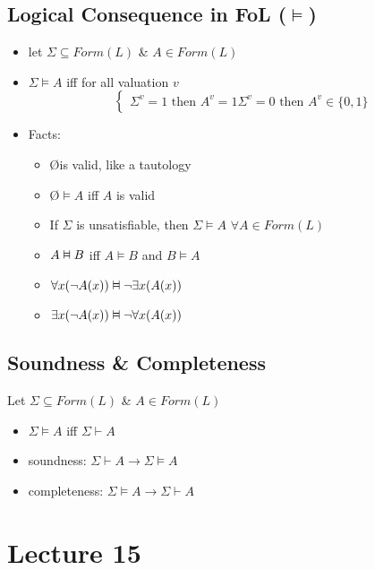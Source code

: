 \documentclass[11pt]{article}
\newcommand{\vDashv}{%
  \mathrel{%
    \text{%
      \ooalign{$\vDash$\cr\reflectbox{$\vDash$}\cr}%
    }%
  }%
}
\begin{document}
\subsection{Logical Consequence in FoL ($\vDash$)}
\begin{itemize}
    \item let $\Sigma\subseteq Form(L)$ \& $A\in Form(L)$
    \item $\Sigma\vDash A$ iff for all valuation $v$
    \begin{equation*}
        \begin{cases}
            \Sigma^v = 1\text{ then } A^v = 1
            \Sigma^v = 0\text{ then } A^v\in\{0,1\}
        \end{cases}
    \end{equation*}
    \item Facts:
    \begin{itemize}
        \item \O is valid, like a tautology 
        \item \O $\vDash A$ iff $A$ is valid 
        \item If $\Sigma$ is unsatisfiable, then $\Sigma\vDash A$ $\forall A\in Form(L)$
        \item $A\vDashv B$ iff $A\vDash B$ and $B\vDash A$
        \item $\forall x(\neg A(x))\vDashv \neg \exists x(A(x))$
        \item $\exists x(\neg A(x))\vDashv \neg \forall x(A(x))$
    \end{itemize}
\end{itemize}
\subsection{Soundness \& Completeness}
Let $\Sigma\subseteq Form(L)$ \& $A\in Form(L)$
\begin{itemize}
    \item $\Sigma\vDash A$ iff $\Sigma\vdash A$
    \item soundness: $\Sigma\vdash A\rightarrow \Sigma\vDash A$
    \item completeness: $\Sigma\vDash A\rightarrow \Sigma\vdash A$
\end{itemize}

\section{Lecture 15}
\end{document}
